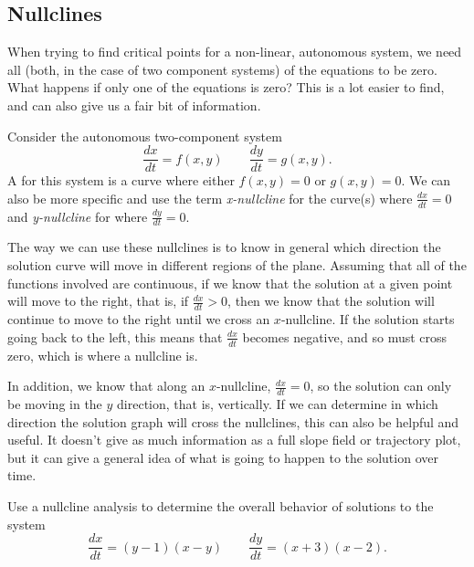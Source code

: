 \subsection{Nullclines}

When trying to find critical points for a non-linear, autonomous system, we need all (both, in the case of two component systems) of the equations to be zero. What happens if only one of the equations is zero? This is a lot easier to find, and can also give us a fair bit of information. 

\begin{definition}[Nullcline] 
Consider the autonomous two-component system
\begin{equation*}
\frac{dx}{dt} = f(x,y) \qquad \frac{dy}{dt} = g(x,y).
\end{equation*}
A \emph{} for this system is a curve where either $f(x,y) = 0$ or $g(x,y) = 0$. We can also be more specific and use the term \emph{x-nullcline} for the curve(s) where $\frac{dx}{dt} = 0$ and \emph{y-nullcline} for where $\frac{dy}{dt} = 0$.
\end{definition}

The way we can use these nullclines is to know in general which direction the solution curve will move in different regions of the plane. Assuming that all of the functions involved are continuous, if we know that the solution at a given point will move to the right, that is, if $\frac{dx}{dt} > 0$, then we know that the solution will continue to move to the right until we cross an $x$-nullcline. If the solution starts going back to the left, this means that $\frac{dx}{dt}$ becomes negative, and so must cross zero, which is where a nullcline is.

In addition, we know that along an $x$-nullcline, $\frac{dx}{dt} = 0$, so the solution can only be moving in the $y$ direction, that is, vertically. If we can determine in which direction the solution graph will cross the nullclines, this can also be helpful and useful. It doesn't give as much information as a full slope field or trajectory plot, but it can give a general idea of what is going to happen to the solution over time. 

\begin{example} \label{ex:Nullcline1}
Use a nullcline analysis to determine the overall behavior of solutions to the system
\begin{equation*}
\frac{dx}{dt} = (y-1)(x-y) \qquad \frac{dy}{dt} = (x+3)(x-2).
\end{equation*}
\end{example}

